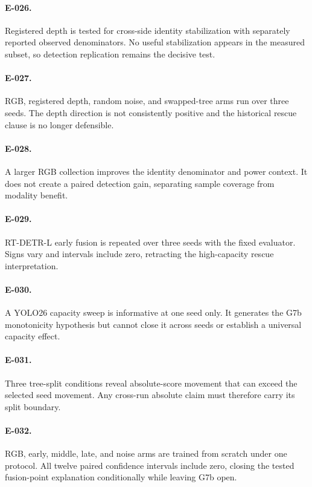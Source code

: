 \documentclass[preprint,12pt]{elsarticle}
\begin{document}
\paragraph{E-026.} Registered depth is tested for cross-side identity
stabilization with separately reported observed denominators. No useful
stabilization appears in the measured subset, so detection replication remains
the decisive test.
\paragraph{E-027.} RGB, registered depth, random noise, and swapped-tree arms
run over three seeds. The depth direction is not consistently positive and
the historical rescue clause is no longer defensible.
\paragraph{E-028.} A larger RGB collection improves the identity
denominator and power context. It does not create a paired detection gain,
separating sample coverage from modality benefit.
\paragraph{E-029.} RT-DETR-L early fusion is repeated over three seeds with the
fixed evaluator. Signs vary and intervals include zero, retracting the
high-capacity rescue interpretation.
\paragraph{E-030.} A YOLO26 capacity sweep is informative at one seed only.
It generates the G7b monotonicity hypothesis but cannot close it across
seeds or establish a universal capacity effect.
\paragraph{E-031.} Three tree-split conditions reveal absolute-score
movement that can exceed the selected seed movement. Any cross-run absolute
claim must therefore carry its split boundary.
\paragraph{E-032.} RGB, early, middle, late, and noise arms are trained from
scratch under one protocol. All twelve paired confidence intervals include
zero, closing the tested fusion-point explanation conditionally while leaving
G7b open.
\end{document}

